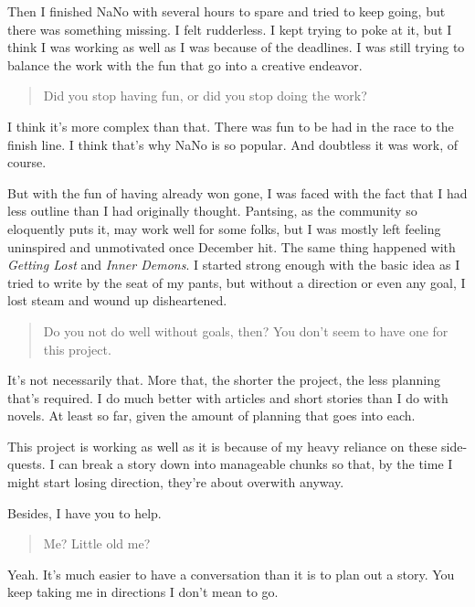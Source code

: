 Then I finished NaNo with several hours to spare and tried to keep going, but there was something missing. I felt rudderless. I kept trying to poke at it, but I think I was working as well as I was because of the deadlines. I was still trying to balance the work with the fun that go into a creative endeavor.

\begin{quote}
Did you stop having fun, or did you stop doing the work?
\end{quote}

I think it's more complex than that. There was fun to be had in the race to the finish line. I think that's why NaNo is so popular. And doubtless it was work, of course.

But with the fun of having already won gone, I was faced with the fact that I had less outline than I had originally thought. Pantsing, as the community so eloquently puts it, may work well for some folks, but I was mostly left feeling uninspired and unmotivated once December hit. The same thing happened with \emph{Getting Lost} and \emph{Inner Demons}. I started strong enough with the basic idea as I tried to write by the seat of my pants, but without a direction or even any goal, I lost steam and wound up disheartened.

\begin{quote}
Do you not do well without goals, then? You don't seem to have one for this project.
\end{quote}

It's not necessarily that. More that, the shorter the project, the less planning that's required. I do much better with articles and short stories than I do with novels. At least so far, given the amount of planning that goes into each.

This project is working as well as it is because of my heavy reliance on these side-quests. I can break a story down into manageable chunks so that, by the time I might start losing direction, they're about overwith anyway.

Besides, I have you to help.

\begin{quote}
Me? Little old me?
\end{quote}

Yeah. It's much easier to have a conversation than it is to plan out a story. You keep taking me in directions I don't mean to go.
